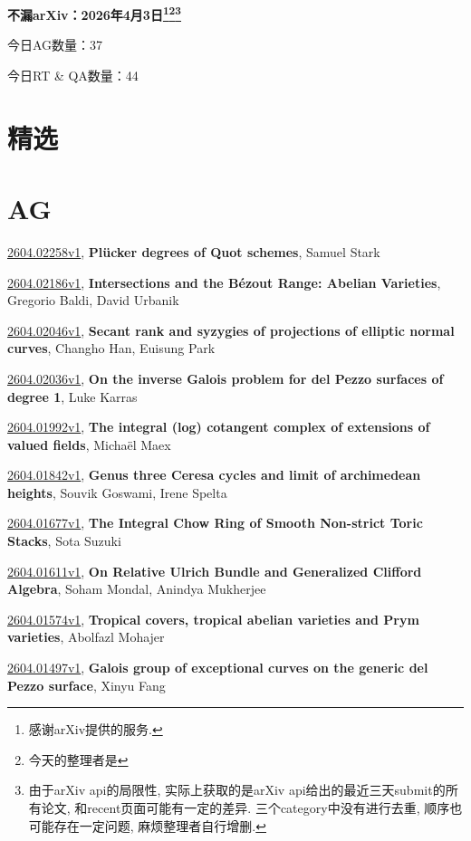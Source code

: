 \documentclass[9pt, a4paper]{article}
\theoremstyle{plain}
\theoremstyle{definition}
\theoremstyle{remark}
\newcommand{\arxiv}[3]{\href{https://arxiv.org/abs/#1}{#1}, \textbf{\textcolor{arxivblue}{#2}}, #3}
\newcommand{\AGnumber}{37}
\newcommand{\RTQAnumber}{44}
\newcommand{\NewestDate}{2026年4月3日}
\newcommand{\todayarXiver}{} %
\begin{document}
\begin{center}
    \Huge\textbf{不漏arXiv：\NewestDate\footnote{感谢arXiv提供的服务.}\footnote{今天的整理者是\todayarXiver}\footnote{由于arXiv api的局限性, 实际上获取的是arXiv api给出的最近三天submit的所有论文, 和recent页面可能有一定的差异. 三个category中没有进行去重, 顺序也可能存在一定问题, 麻烦整理者自行增删.}} \\
\end{center}

\setcounter{section}{-1}

\begin{center}
    今日AG数量：\AGnumber
    
    今日RT \& QA数量：\RTQAnumber
    
\end{center}


\section{精选}


\section{AG}
\arxiv{2604.02258v1}{Plücker degrees of Quot schemes}{Samuel Stark}

\arxiv{2604.02186v1}{Intersections and the Bézout Range: Abelian Varieties}{Gregorio Baldi, David Urbanik}

\arxiv{2604.02046v1}{Secant rank and syzygies of projections of elliptic normal curves}{Changho Han, Euisung Park}

\arxiv{2604.02036v1}{On the inverse Galois problem for del Pezzo surfaces of degree 1}{Luke Karras}

\arxiv{2604.01992v1}{The integral (log) cotangent complex of extensions of valued fields}{Michaël Maex}

\arxiv{2604.01842v1}{Genus three Ceresa cycles and limit of archimedean heights}{Souvik Goswami, Irene Spelta}

\arxiv{2604.01677v1}{The Integral Chow Ring of Smooth Non-strict Toric Stacks}{Sota Suzuki}

\arxiv{2604.01611v1}{On Relative Ulrich Bundle and Generalized Clifford Algebra}{Soham Mondal, Anindya Mukherjee}

\arxiv{2604.01574v1}{Tropical covers, tropical abelian varieties and Prym varieties}{Abolfazl Mohajer}

\arxiv{2604.01497v1}{Galois group of exceptional curves on the generic del Pezzo surface}{Xinyu Fang}
\end{document}
